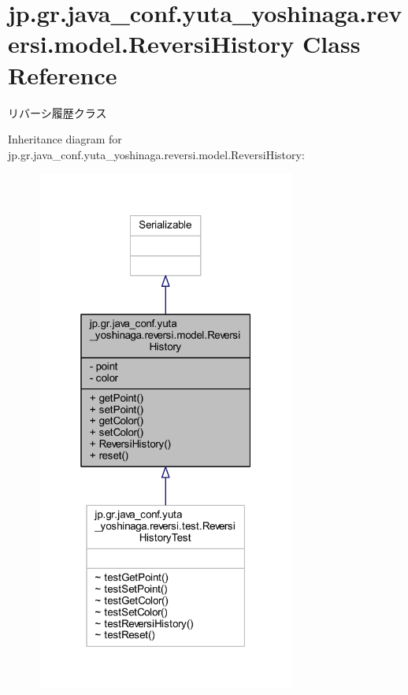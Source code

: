 \hypertarget{classjp_1_1gr_1_1java__conf_1_1yuta__yoshinaga_1_1reversi_1_1model_1_1_reversi_history}{}\section{jp.\+gr.\+java\+\_\+conf.\+yuta\+\_\+yoshinaga.\+reversi.\+model.\+Reversi\+History Class Reference}
\label{classjp_1_1gr_1_1java__conf_1_1yuta__yoshinaga_1_1reversi_1_1model_1_1_reversi_history}


リバーシ履歴クラス  




Inheritance diagram for jp.\+gr.\+java\+\_\+conf.\+yuta\+\_\+yoshinaga.\+reversi.\+model.\+Reversi\+History\+:\nopagebreak
\begin{figure}[H]
\begin{center}
\leavevmode
\includegraphics[width=241pt]{classjp_1_1gr_1_1java__conf_1_1yuta__yoshinaga_1_1reversi_1_1model_1_1_reversi_history__inherit__graph}
\end{center}
\end{figure}


